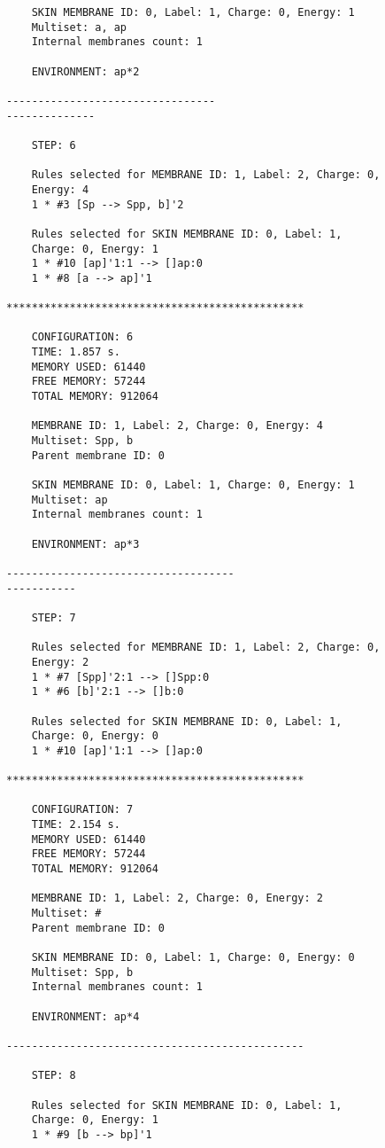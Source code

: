 \documentclass{acm_proc_article-sp}
\begin{document}
\begin{lstlisting}
    SKIN MEMBRANE ID: 0, Label: 1, Charge: 0, Energy: 1
    Multiset: a, ap
    Internal membranes count: 1

    ENVIRONMENT: ap*2

---------------------------------
--------------

    STEP: 6

    Rules selected for MEMBRANE ID: 1, Label: 2, Charge: 0, 
    Energy: 4
    1 * #3 [Sp --> Spp, b]'2

    Rules selected for SKIN MEMBRANE ID: 0, Label: 1, 
    Charge: 0, Energy: 1
    1 * #10 [ap]'1:1 --> []ap:0
    1 * #8 [a --> ap]'1

***********************************************

    CONFIGURATION: 6
    TIME: 1.857 s.
    MEMORY USED: 61440
    FREE MEMORY: 57244
    TOTAL MEMORY: 912064

    MEMBRANE ID: 1, Label: 2, Charge: 0, Energy: 4
    Multiset: Spp, b
    Parent membrane ID: 0

    SKIN MEMBRANE ID: 0, Label: 1, Charge: 0, Energy: 1
    Multiset: ap
    Internal membranes count: 1

    ENVIRONMENT: ap*3

------------------------------------
-----------

    STEP: 7

    Rules selected for MEMBRANE ID: 1, Label: 2, Charge: 0, 
    Energy: 2
    1 * #7 [Spp]'2:1 --> []Spp:0
    1 * #6 [b]'2:1 --> []b:0

    Rules selected for SKIN MEMBRANE ID: 0, Label: 1, 
    Charge: 0, Energy: 0
    1 * #10 [ap]'1:1 --> []ap:0

***********************************************

    CONFIGURATION: 7
    TIME: 2.154 s.
    MEMORY USED: 61440
    FREE MEMORY: 57244
    TOTAL MEMORY: 912064

    MEMBRANE ID: 1, Label: 2, Charge: 0, Energy: 2
    Multiset: #
    Parent membrane ID: 0

    SKIN MEMBRANE ID: 0, Label: 1, Charge: 0, Energy: 0
    Multiset: Spp, b
    Internal membranes count: 1

    ENVIRONMENT: ap*4

-----------------------------------------------

    STEP: 8

    Rules selected for SKIN MEMBRANE ID: 0, Label: 1, 
    Charge: 0, Energy: 1
    1 * #9 [b --> bp]'1


\end{lstlisting}
\end{document}

